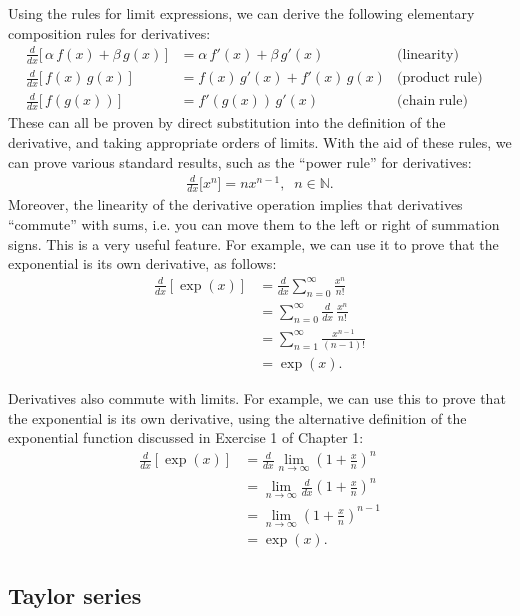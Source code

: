 \documentclass[10pt,a4paper]{article}
\begin{document}
Using the rules for limit expressions, we can derive the following
elementary composition rules for derivatives:
\begin{align}
  \frac{d}{dx}\big[\,\alpha\, f(x) + \beta\, g(x)\,\big] &= \alpha\, f'(x) + \beta\, g'(x) \quad &\textrm{(linearity)}& \\   \frac{d}{dx}\big[\,f(x) \, g(x)\,\big] &= f(x) \, g'(x) + f'(x) \, g(x) &\textrm{(product}\;\textrm{rule)}& \\   \frac{d}{dx}\big[\,f(g(x))\,\big] &= f'(g(x)) \, g'(x) &\textrm{(chain}\;\textrm{rule)}&
\end{align}
These can all be proven by direct substitution into the definition of
the derivative, and taking appropriate orders of limits.  With the aid
of these rules, we can prove various standard results, such as the
``power rule'' for derivatives:
\begin{align}
  \frac{d}{dx} \big[x^n\big] = n x^{n-1}, \;\;n \in \mathbb{N}.
\end{align}
Moreover, the linearity of the derivative operation implies that
derivatives ``commute'' with sums, i.e. you can move them to the left
or right of summation signs. This is a very useful feature. For
example, we can use it to prove that the exponential is its own
derivative, as follows:
\begin{align}
  \frac{d}{dx} \left[\exp(x)\right] &= \frac{d}{dx} \sum_{n=0}^\infty\frac{x^n}{n!} \\
  &= \sum_{n=0}^\infty\frac{d}{dx} \, \frac{x^n}{n!} \\
  &= \sum_{n=1}^\infty \frac{x^{n-1}}{(n-1)!} \\
  &=\exp(x).
\end{align}

Derivatives also commute with limits.  For example, we can use this to
prove that the exponential is its own derivative, using the
alternative definition of the exponential function discussed in
Exercise 1 of Chapter 1:
\begin{align}
  \frac{d}{dx} \left[\exp(x)\right] &= \frac{d}{dx} \lim_{n\rightarrow\infty} \left(1+\frac{x}{n}\right)^n \\
  &= \lim_{n\rightarrow\infty} \frac{d}{dx} \left(1+\frac{x}{n}\right)^n \\
  &= \lim_{n\rightarrow\infty} \left(1+\frac{x}{n}\right)^{n-1} \\
  &= \exp(x).
\end{align}

\subsection{Taylor series}\label{taylor-series}
\end{document}
